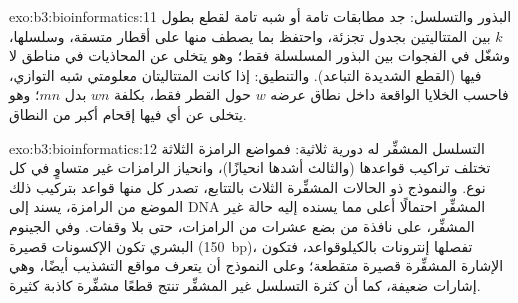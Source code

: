 \begin{solution}{exo:b3:bioinformatics:11}
البذور والتسلسل: جد مطابقات تامة أو شبه تامة لقطع بطول $k$ بين
المتتاليتين بجدول تجزئة، واحتفظ بما يصطف منها على
أقطار متسقة، وسلسلها، وشغّل  في
الفجوات بين البذور المسلسلة فقط؛ وهو يتخلى عن المحاذيات في مناطق
لا  فيها (القطع الشديدة التباعد). والتنطيق: إذا كانت المتتاليتان
معلومتي شبه التوازي، فاحسب الخلايا الواقعة داخل نطاق
عرضه $w$ حول القطر فقط، بكلفة $wn$ بدل $mn$؛ وهو يتخلى
عن أي  فيها إقحام أكبر من النطاق.
\end{solution}

\begin{solution}{exo:b3:bioinformatics:12}
التسلسل المشفِّر له دورية ثلاثية: فمواضع الرامزة الثلاثة
تختلف تراكيب قواعدها (والثالث أشدها انحيازًا)، وانحياز
الرامزات غير متساوٍ في كل نوع. والنموذج ذو الحالات المشفِّرة الثلاث
بالتتابع، تصدر كل منها قواعد بتركيب ذلك الموضع من
الرامزة، يسند إلى DNA المشفِّر احتمالًا أعلى مما يسنده
إليه حالة غير المشفِّر، على نافذة من بضع عشرات من الرامزات، حتى بلا وقفات.
وفي الجينوم البشري تكون الإكسونات قصيرة (\qty{150}{bp})، تفصلها إنترونات
بالكيلوقواعد، فتكون الإشارة المشفِّرة قصيرة متقطعة؛ وعلى النموذج
أن يتعرف مواقع التشذيب أيضًا، وهي إشارات ضعيفة، كما أن
كثرة التسلسل غير المشفِّر تنتج قطعًا مشفِّرة كاذبة
كثيرة.
\end{solution}

